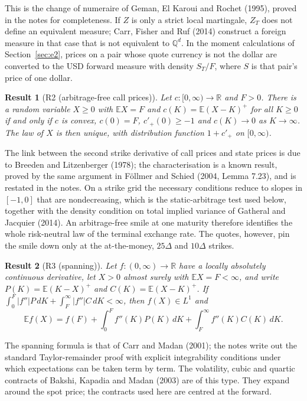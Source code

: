 \documentclass[11pt]{article}
\theoremstyle{result}
\newtheorem*{result}{Result}
\newcommand{\E}{\mathbb{E}}
\newcommand{\Q}{\mathbb{Q}}
\newcommand{\D}{\Delta}
\begin{document}
This is the change of numeraire of Geman, El Karoui and Rochet (1995), proved in the notes for completeness. If $Z$ is only a strict local martingale, $Z_T$ does not define an equivalent measure; Carr, Fisher and Ruf (2014) construct a foreign measure in that case that is not equivalent to $\Q^d$. In the moment calculations of Section~\ref{sec:e2}, prices on a pair whose quote currency is not the dollar are converted to the USD forward measure with density $S_T/F$, where $S$ is that pair's price of one dollar.

\begin{result}[R2 (arbitrage-free call prices)]
Let $c:[0,\infty)\to\mathbb R$ and $F>0$. There is a random variable $X\ge0$ with $\E X=F$ and $c(K)=\E(X-K)^+$ for all $K\ge0$ if and only if $c$ is convex, $c(0)=F$, $c'_+(0)\ge-1$ and $c(K)\to0$ as $K\to\infty$. The law of $X$ is then unique, with distribution function $1+c'_+$ on $[0,\infty)$.
\end{result}

The link between the second strike derivative of call prices and state prices is due to Breeden and Litzenberger (1978); the characterisation is a known result, proved by the same argument in F\"ollmer and Schied (2004, Lemma 7.23), and is restated in the notes. On a strike grid the necessary conditions reduce to slopes in $[-1,0]$ that are nondecreasing, which is the static-arbitrage test used below, together with the density condition on total implied variance of Gatheral and Jacquier (2014). An arbitrage-free smile at one maturity therefore identifies the whole risk-neutral law of the terminal exchange rate. The quotes, however, pin the smile down only at the at-the-money, $25\D$ and $10\D$ strikes.

\begin{result}[R3 (spanning)]
Let $f:(0,\infty)\to\mathbb R$ have a locally absolutely continuous derivative, let $X>0$ almost surely with $\E X=F<\infty$, and write $P(K)=\E(K-X)^+$ and $C(K)=\E(X-K)^+$. If $\int_0^F|f''|P\,dK+\int_F^\infty|f''|C\,dK<\infty$, then $f(X)\in L^1$ and
\[
\E f(X)=f(F)+\int_0^F f''(K)P(K)\,dK+\int_F^\infty f''(K)C(K)\,dK.
\]
\end{result}

The spanning formula is that of Carr and Madan (2001); the notes write out the standard Taylor-remainder proof with explicit integrability conditions under which expectations can be taken term by term. The volatility, cubic and quartic contracts of Bakshi, Kapadia and Madan (2003) are of this type. They expand around the spot price; the contracts used here are centred at the forward.
\end{document}
